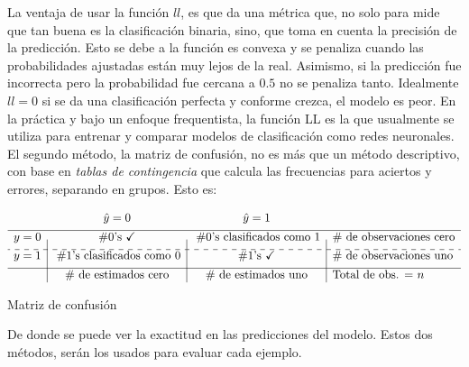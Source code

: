 \documentclass[../Main/Main.tex]{subfiles}
\begin{document}
La ventaja de usar la función $ll$, es que da una métrica que, no solo para mide que tan buena es la clasificación binaria, sino, que toma en cuenta la precisión de la predicción. Esto se debe a la función es convexa y se penaliza cuando las probabilidades ajustadas están muy lejos de la real. Asimismo, si la predicción fue incorrecta pero la probabilidad fue cercana a $0.5$ no se penaliza tanto. Idealmente $ll = 0$ si se da una clasificación perfecta y conforme crezca, el modelo es peor. En la práctica y bajo un enfoque frequentista, la función LL es la que usualmente se utiliza para entrenar y comparar modelos de clasificación como redes neuronales.\\

El segundo método, la matriz de confusión, no es más que un método descriptivo, con base en \textit{tablas de contingencia} que calcula las frecuencias para aciertos y errores, separando en grupos. Esto es:
\begin{table}[H]
\centering
$\begin{array}{c|c|c|l}
~ & \hat{y} = 0 & \hat{y} = 1 & ~ \\[4pt]
\hline
y = 0 & \# 0\text{'s } \checkmark  & \;\# 0\text{'s clasificados como }1 & \#\text{ de observaciones cero} \\[4pt]
\cdashline{1-4}
y = 1 & \;\# 1\text{'s clasificados como }0 & \# 1\text{'s } \checkmark & \#\text{ de observaciones uno} \\[4pt]
\hline
~ & \# \text{ de estimados cero} & \# \text{ de estimados uno} &  \text{Total de obs. = } n
\end{array}$
\caption*{Matriz de confusión}
\label{tab:MatrizConfusion}
\end{table}

De donde se puede ver la exactitud en las predicciones del modelo. Estos dos métodos, serán los usados para evaluar cada ejemplo. 
\end{document}
